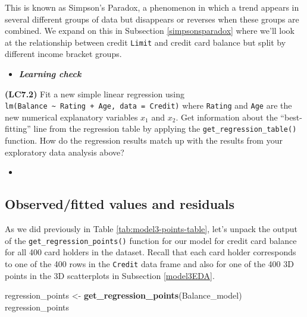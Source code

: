 \documentclass[12pt, krantz2,]{krantz}
\makeatletter
\newenvironment{Shaded}{\begin{snugshade}}{\end{snugshade}}
\newcommand{\KeywordTok}[1]{\textcolor[rgb]{0.27,0.27,0.27}{\textbf{#1}}}
\newcommand{\NormalTok}[1]{#1}
\newcommand{\StringTok}[1]{\textcolor[rgb]{0.5,0.5,0.5}{#1}}
\newenvironment{kframe}{%
\medskip{}
\setlength{\fboxsep}{.8em}
 \def\at@end@of@kframe{}%
 \ifinner\ifhmode%
  \def\at@end@of@kframe{\end{minipage}}%
  \begin{minipage}{\columnwidth}%
 \fi\fi%
 \def\FrameCommand##1{\hskip\@totalleftmargin \hskip-\fboxsep
 \colorbox{shadecolor}{##1}\hskip-\fboxsep
     \hskip-\linewidth \hskip-\@totalleftmargin \hskip\columnwidth}%
 \MakeFramed {\advance\hsize-\width
   \@totalleftmargin\z@ \linewidth\hsize
   \@setminipage}}%
 {\par\unskip\endMakeFramed%
 \at@end@of@kframe}
\renewenvironment{Shaded}{\begin{kframe}}{\end{kframe}}
\newenvironment{rmdblock}[1]
  {\begin{shaded*}
  \begin{itemize}
  \renewcommand{\labelitemi}{
    \raisebox{-.7\height}[0pt][0pt]{
    }
  }
  \item
  }
  {
  \end{itemize}
  \end{shaded*}
  }
\newenvironment{learncheck}
  {\begin{rmdblock}{warning}}
  {\end{rmdblock}}
\makeatother
\begin{document}
This is known as Simpson's Paradox, a phenomenon in which a trend appears in several different groups of data but disappears or reverses when these groups are combined. We expand on this in Subsection \ref{simpsonsparadox} where we'll look at the relationship between credit \texttt{Limit} and credit card balance but split by different income bracket groups.

\begin{learncheck}
\textbf{\emph{Learning check}}
\end{learncheck}

\textbf{(LC7.2)} Fit a new simple linear regression using \texttt{lm(Balance\ \textasciitilde{}\ Rating\ +\ Age,\ data\ =\ Credit)} where \texttt{Rating} and \texttt{Age} are the new numerical explanatory variables \(x_1\) and \(x_2\). Get information about the ``best-fitting'' line from the regression table by applying the \texttt{get\_regression\_table()} function. How do the regression results match up with the results from your exploratory data analysis above?

\begin{learncheck}

\end{learncheck}

\hypertarget{model3points}{%
\subsection{Observed/fitted values and residuals}\label{model3points}}

As we did previously in Table \ref{tab:model3-points-table}, let's unpack the output of the \texttt{get\_regression\_points()} function for our model for credit card balance for all 400 card holders in the dataset. Recall that each card holder corresponds to one of the 400 rows in the \texttt{Credit} data frame and also for one of the 400 3D points in the 3D scatterplots in Subsection \ref{model3EDA}.

\begin{Shaded}
\begin{Highlighting}[]
\NormalTok{regression_points <-}\StringTok{ }\KeywordTok{get_regression_points}\NormalTok{(Balance_model)}
\NormalTok{regression_points}
\end{Highlighting}
\end{Shaded}
\end{document}
